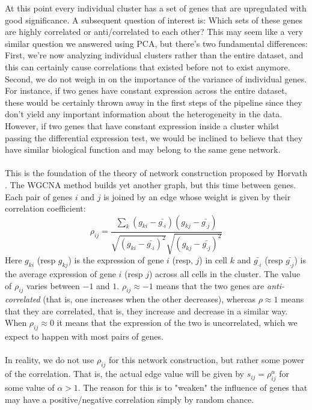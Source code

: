 At this point every individual cluster has a set of genes that are upregulated with good significance. A subsequent question of interest is: Which sets of these genes are highly correlated or anti/correlated to each other? This may seem like a very similar question we answered using PCA, but there's two fundamental differences: First, we're now analyzing individual clusters rather than the entire dataset, and this can certainly cause correlations that existed before not to exist anymore. Second, we do not weigh in on the importance of the variance of individual genes. For instance, if two genes have constant expression across the entire dataset, these would be certainly thrown away in the first steps of the pipeline since they don't yield any important information about the heterogeneity in the data. However, if two genes that have constant expression inside a cluster whilst passing the differential expression test, we would be inclined to believe that they have similar biological function and may belong to the same gene network.\\
\\
This is the foundation of the theory of network construction proposed by Horvath \cite{}. The WGCNA method builds yet another graph, but this time between genes. Each pair of genes $i$ and $j$ is joined by an edge whose weight is given by their correlation coefficient:
$$
\rho_{ij} = \frac{\sum_{k} (g_{ki} - \bar{g_{\cdot i}})(g_{kj} - \bar{g_{\cdot j}})}	{\sqrt{(g_{ki} - \bar{g_{\cdot i}})^2}\sqrt{(g_{kj} - \bar{g_{\cdot j}})^2}}
$$
Here $g_{ki}$ (resp $g_{kj}$) is the expression of gene $i$ (resp, $j$) in cell $k$ and $\bar{g_{\cdot i}}$ (resp $\bar{g_{\cdot j}}$) is the average expression of gene $i$ (resp $j$) across all cells in the cluster. The value of $\rho_{ij}$ varies between $-1$ and $1$. $\rho_{ij} \approx -1$ means that the two genes are \emph{anti-correlated} (that is, one increases when the other decreases), whereas $\rho \approx 1$ means that they are correlated, that is, they increase and decrease in a similar way. When $\rho_{ij} \approx 0$ it means that the expression of the two is uncorrelated, which we expect to happen with most pairs of genes. \\
\\
In reality, we do not use $\rho_{ij}$ for this network construction, but rather some power of the correlation. That is, the actual edge value will be given by $s_{ij} = \rho_{ij}^{\alpha}$ for some value of $\alpha>1$. The reason for this is to "weaken" the influence of genes that may have a positive/negative correlation simply by random chance. \\
